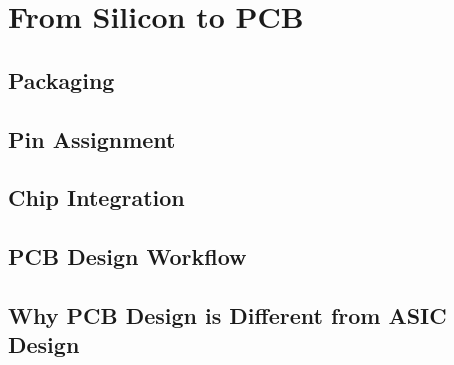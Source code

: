\chapter{From Silicon to PCB}

\section{Packaging}

\section{Pin Assignment}

\section{Chip Integration}

\section{PCB Design Workflow}

\section{Why PCB Design is Different from ASIC Design}
